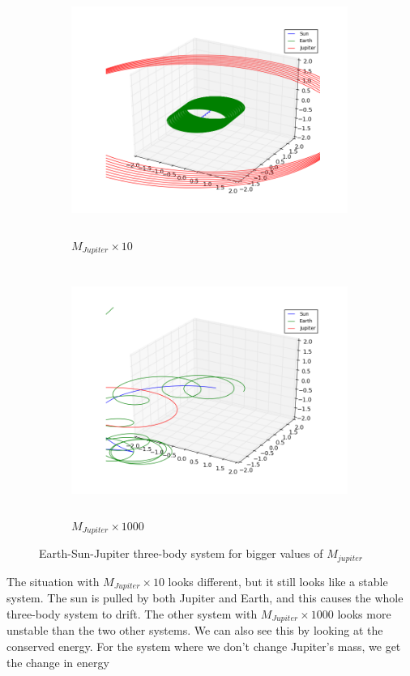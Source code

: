 \documentclass[%
 reprint,
 nobalance,
 amsmath,amssymb,
 aps,
]{revtex4-1}
\begin{document}
 \begin{figure}[H]
     \centering
     \begin{subfigure}[h]{0.5\textwidth}
         \centering
         \includegraphics[height=3.2in, width=0.99\textwidth]{plot/earth_sun_jupiter_mj10.png}
         \caption{$M_{Jupiter}\times 10$}
     \end{subfigure}
     \begin{subfigure}[h]{0.5\textwidth}
         \centering
         \includegraphics[height=3.2in, width=0.99\textwidth]{plot/earth_sun_jupiter_mj1000.png}
         \caption{$M_{Jupiter}\times 1000$}
     \end{subfigure}
     \caption{Earth-Sun-Jupiter three-body system for bigger values of $M_{jupiter}$}\label{fig:2}
 \end{figure}

The situation with $M_{Jupiter}\times 10$ looks different, but it still looks like a stable system. The sun is pulled by both Jupiter and Earth, and this causes the whole three-body system to drift. The other system with $M_{Jupiter}\times 1000$ looks more unstable than the two other systems. 
We can also see this by looking at the conserved energy. For the system where we don't change Jupiter's mass, we get the change in energy
\end{document}
